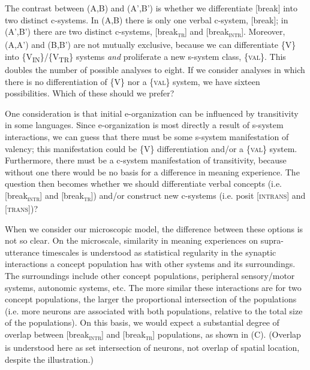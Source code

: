   The contrast between (A,B) and (A',B') is whether we differentiate [break] into two distinct c-systems. In (A,B) there is only one verbal c-system, [break]; in (A',B') there are two distinct c-systems, [break\textsc{\textsubscript{tr}}] and [break\textsc{\textsubscript{intr}}]. Moreover, (A,A') and (B,B') are not mutually exclusive, because we can differentiate \{V\} into \{V\textsubscript{IN}\}/\{V\textsubscript{TR}\} systems \textit{and} proliferate a new s-system class, \{\textsc{val}\}. This doubles the number of possible analyses to eight. If we consider analyses in which there is no differentiation of \{V\} nor a \{\textsc{val}\} system, we have sixteen possibilities. Which of these should we prefer? 

  One consideration is that initial e-organization can be influenced by transitivity in some languages. Since e-organization is most directly a result of s-system interactions, we can guess that there must be some s-system manifestation of valency; this manifestation could be \{V\} differentiation and/or a \{\textsc{val}\} system. Furthermore, there must be a c-system manifestation of transitivity, because without one there would be no basis for a difference in meaning experience. The question then becomes whether we should differentiate verbal concepts (i.e. [break\textsc{\textsubscript{intr}}] and [break\textsc{\textsubscript{tr}}]) and/or construct new c-systems (i.e. posit [\textsc{intrans}] and [\textsc{trans}])?

  When we consider our microscopic model, the difference between these options is not so clear. On the microscale, similarity in meaning experiences on supra-utterance timescales is understood as statistical regularity in the synaptic interactions a concept population has with other systems and its surroundings. The surroundings include other concept populations, peripheral sensory/motor systems, autonomic systems, etc. The more similar these interactions are for two concept populations, the larger the proportional intersection of the populations (i.e. more neurons are associated with both populations, relative to the total size of the populations). On this basis, we would expect a substantial degree of overlap between [break\textsc{\textsubscript{intr}}] and [break\textsc{\textsubscript{tr}}] populations, as shown in {}(C). (Overlap is understood here as set intersection of neurons, not overlap of spatial location, despite the illustration.)

